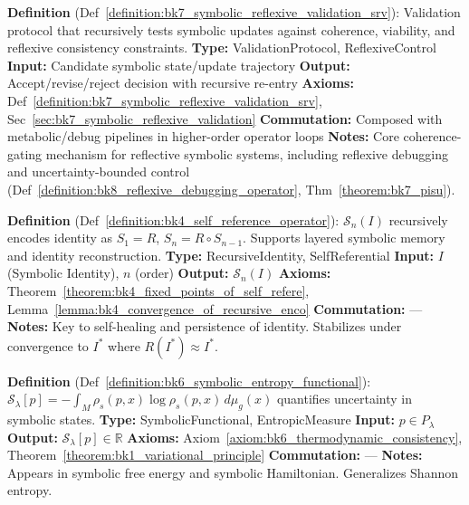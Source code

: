 \begin{description}[leftmargin=2.5cm, style=nextline]
\item[\textbf{Symbolic Reflexive Validation} \hfill \ensuremath{\mathrm{SRV}}] 
\label{dict:appA_symbolic_reflexive_validation}
\textbf{Definition} (Def~\ref{definition:bk7_symbolic_reflexive_validation_srv}): Validation protocol that recursively tests symbolic updates against coherence, viability, and reflexive consistency constraints.
\textbf{Type:} ValidationProtocol, ReflexiveControl
\textbf{Input:} Candidate symbolic state/update trajectory
\textbf{Output:} Accept/revise/reject decision with recursive re-entry
\textbf{Axioms:} Def~\ref{definition:bk7_symbolic_reflexive_validation_srv}, Sec~\ref{sec:bk7_symbolic_reflexive_validation}
\textbf{Commutation:} Composed with metabolic/debug pipelines in higher-order operator loops
\textbf{Notes:} Core coherence-gating mechanism for reflective symbolic systems, including reflexive debugging and uncertainty-bounded control (Def~\ref{definition:bk8_reflexive_debugging_operator}, Thm~\ref{theorem:bk7_pisu}).

\item[\textbf{Self-Reference Operator} \hfill \ensuremath{\mathcal{S}_n}] 
\label{dict:appA_self_reference_operator}
\textbf{Definition} (Def~\ref{definition:bk4_self_reference_operator}): \( \mathcal{S}_n(I) \) recursively encodes identity as \( S_1 = R \), \( S_n = R \circ S_{n-1} \). Supports layered symbolic memory and identity reconstruction.
\textbf{Type:} RecursiveIdentity, SelfReferential
\textbf{Input:} \( I \) (Symbolic Identity), \( n \) (order)
\textbf{Output:} \( \mathcal{S}_n(I) \)
\textbf{Axioms:} Theorem~\ref{theorem:bk4_fixed_points_of_self_refere}, Lemma~\ref{lemma:bk4_convergence_of_recursive_enco}
\textbf{Commutation:} ---
\textbf{Notes:} Key to self-healing and persistence of identity. Stabilizes under convergence to \( I^* \) where \( R(I^*) \approx I^* \).

\item[\textbf{Symbolic Entropy Operator/Functional} \hfill \ensuremath{\mathcal{S}_{\lambda}[p]}] 
\label{dict:appA_symbolic_entropy_operator_functional}
\textbf{Definition} (Def~\ref{definition:bk6_symbolic_entropy_functional}): \( \mathcal{S}_{\lambda}[p] = -\int_M \rho_s(p,x) \log \rho_s(p,x) \, d\mu_g(x) \) quantifies uncertainty in symbolic states.
\textbf{Type:} SymbolicFunctional, EntropicMeasure
\textbf{Input:} \( p \in P_\lambda \)
\textbf{Output:} \( \mathcal{S}_{\lambda}[p] \in \mathbb{R} \)
\textbf{Axioms:} Axiom~\ref{axiom:bk6_thermodynamic_consistency}, Theorem~\ref{theorem:bk1_variational_principle}
\textbf{Commutation:} ---
\textbf{Notes:} Appears in symbolic free energy and symbolic Hamiltonian. Generalizes Shannon entropy.


\end{description}
